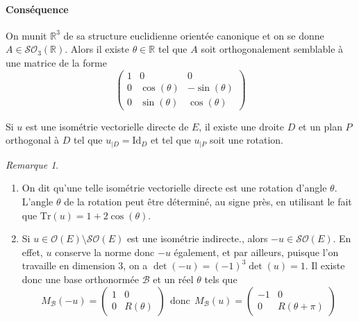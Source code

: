 \documentclass[french]{article}
\newcommand{\R}{\mathbb{R}}
\newcommand{\Tr}{\text{Tr}}
\theoremstyle{plain}
\theoremstyle{definition}
\theoremstyle{remark}
\newtheorem*{rmq}{Remarque}
\begin{document}
\paragraph{Conséquence} On munit $\R^3$ de sa structure euclidienne orientée canonique et on se donne $A\in\mathcal{SO}_3(\R)$. Alors il existe $\theta\in\R$ tel que $A$ soit orthogonalement semblable à une matrice de la forme $$\begin{pmatrix}
	1&0&0\\
	0&\cos(\theta)&-\sin(\theta)\\
	0&\sin(\theta)&\cos(\theta)
\end{pmatrix}$$

\begin{thm}{}
	Si $u$ est une isométrie vectorielle directe de $E$, il existe une droite $D$ et un plan $P$ orthogonal à $D$ tel que $u_{\mid D}=\text{Id}_{D}$ et tel que $u_{\mid P}$ soit une rotation.
\end{thm}

\begin{rmq}
	\begin{enumerate}
		\item On dit qu'une telle isométrie vectorielle directe est une rotation d'angle $\theta$. L'angle $\theta$ de la rotation peut être déterminé, au signe près, en utilisant le fait que $\Tr(u)=1+2\cos(\theta)$.
		\item Si $u\in\mathcal{O}(E)\setminus\mathcal{SO}(E)$ est une isométrie indirecte., alors $-u\in\mathcal{SO}(E)$. En effet, $u$ conserve la norme donc $-u$ également, et par ailleurs, puisque l'on travaille en dimension $3$, on a $\det(-u)=(-1)^3\det(u)=1$. Il existe donc une base orthonormée $\mathcal{B}$ et un réel $\theta$ tels que $$M_\mathcal{B}(-u)=\begin{pmatrix}
			1&0\\
			0&R(\theta)
		\end{pmatrix} \ \ \text{donc}\ \ M_\mathcal{B}(u)=\begin{pmatrix}
		-1&0\\
		0&R(\theta+\pi)
		\end{pmatrix}$$
	\end{enumerate}
\end{rmq}
\end{document}
